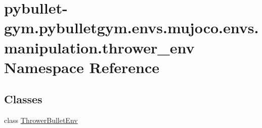 \hypertarget{namespacepybullet-gym_1_1pybulletgym_1_1envs_1_1mujoco_1_1envs_1_1manipulation_1_1thrower__env}{}\section{pybullet-\/gym.pybulletgym.\+envs.\+mujoco.\+envs.\+manipulation.\+thrower\+\_\+env Namespace Reference}
\label{namespacepybullet-gym_1_1pybulletgym_1_1envs_1_1mujoco_1_1envs_1_1manipulation_1_1thrower__env}
\subsection*{Classes}
\begin{DoxyCompactItemize}
\item 
class \hyperlink{classpybullet-gym_1_1pybulletgym_1_1envs_1_1mujoco_1_1envs_1_1manipulation_1_1thrower__env_1_1_thrower_bullet_env}{Thrower\+Bullet\+Env}
\end{DoxyCompactItemize}
